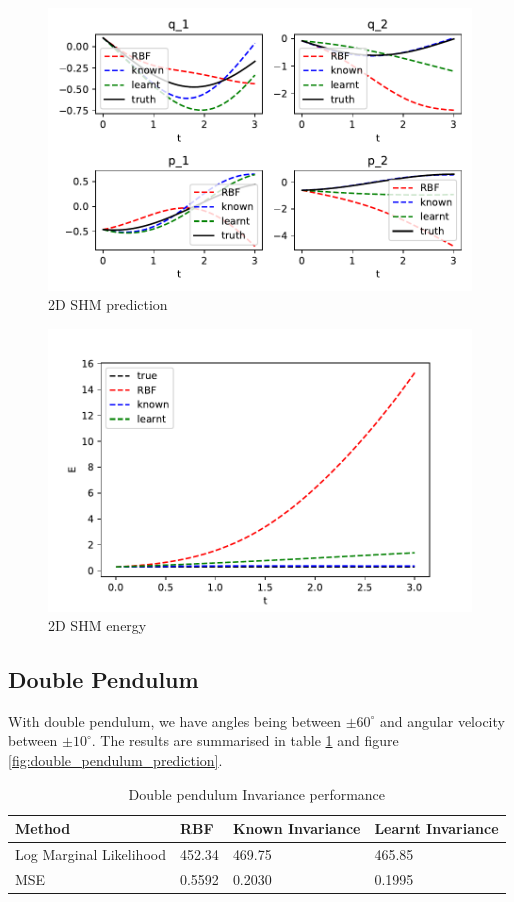\documentclass{statsmsc}
\begin{document}
\begin{figure}[H] 
  \includegraphics[width=0.6\linewidth]{../codes/figures/shm_2d_predicted.pdf}
  \centering
  \caption{2D SHM prediction}
  \label{fig:shm_2d_prediction}
\end{figure}

\begin{figure}[H] 
  \includegraphics[width=0.6\linewidth]{../codes/figures/shm_2d_energy.pdf}
  \centering
  \caption{2D SHM energy}
  \label{fig:shm_2d_energy}
\end{figure}

\subsection{Double Pendulum}
With double pendulum, we have angles being between $\pm 60^\circ$ and angular velocity between $\pm 10^\circ$.
The results are summarised in table \ref{tab:double_pendulum_performance} and figure \ref{fig:double_pendulum_prediction}.
\begin{table}[H]
  \centering
  \begin{tabular}{l l l l}
    \hline
Method           & RBF & Known Invariance&  Learnt Invariance\\
  \hline
    Log Marginal Likelihood & 452.34 & 469.75 & 465.85 \\
MSE & 0.5592 & 0.2030 & 0.1995 \\
    \hline
  \end{tabular}
  \caption{Double pendulum Invariance performance}
  \label{tab:double_pendulum_performance}
\end{table}
\end{document}
